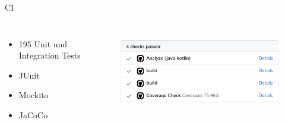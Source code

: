 \begin{frame}{CI}
    \begin{columns}
         \begin{itemize}
            \item 195 Unit und Integration Tests
            \item JUnit
            \item Mockito
            \item JaCoCo
        \end{itemize}
         \begin{figure}
            \centering
            \includegraphics[width=1\linewidth]{pictures/pr_actions}
            \label{fig:pr_actions}
        \end{figure}
    \end{columns}
\end{frame}